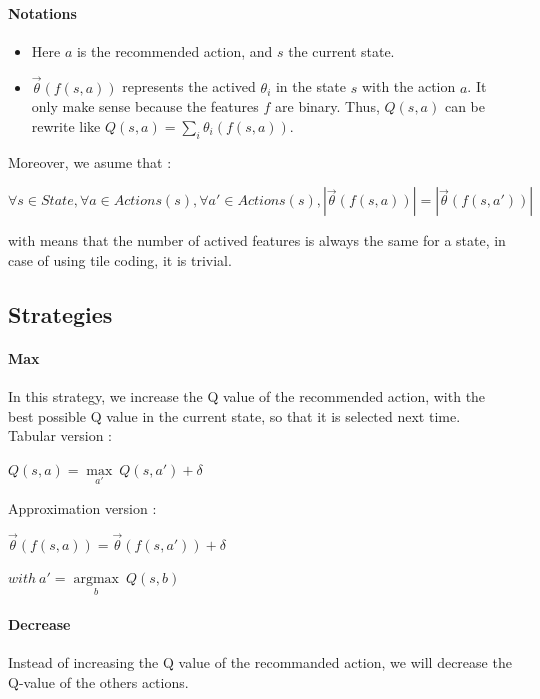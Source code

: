 \documentclass[a4paper,12pt]{article}
\begin{document}
      
      \paragraph{Notations}
      
\begin{itemize}
 \item Here $a$ is the recommended action, and $s$ the current state.
 \item $\vec\theta(f(s,a))$ represents the actived $\theta_i$ in 
      the state $s$ with the action $a$. It only make sense because the features $f$ are binary.
      Thus, $Q(s,a)$ can be rewrite like $Q(s,a) = \sum\limits_{i} \theta_{i}(f(s,a))$.
\end{itemize}

     
     Moreover, we asume that :
      \begin{center}
	$\forall s \in State, \forall a \in Actions(s), \forall a' \in Actions(s), |\vec\theta (f(s,a))| = | \vec\theta (f(s,a'))|$ 
      \end{center}
      with means that the number of actived features is always the same for a state, in case of using
      tile coding, it is trivial.
      

      
      \subsection{Strategies}
      
      \paragraph{Max} In this strategy, we increase the Q value of the recommended action, 
      with the best possible Q value in the current state, so that it is selected next time. 
      \newline
      Tabular version :
      \begin{center}
       $Q(s,a) = \underset{a'}{\operatorname{max}}\ Q(s,a') + \delta$
      \end{center}
      Approximation version :
      \begin{center}
	$\vec\theta(f(s,a)) = \vec\theta(f(s,a')) + \delta$
	
	$with\ a' = \underset{b}{\operatorname{argmax}}\ Q(s,b) $ 
	\end{center}
       
       \paragraph{Decrease} Instead of increasing the Q value of the recommanded action, we will decrease
       the Q-value of the others actions.
       
\end{document}
